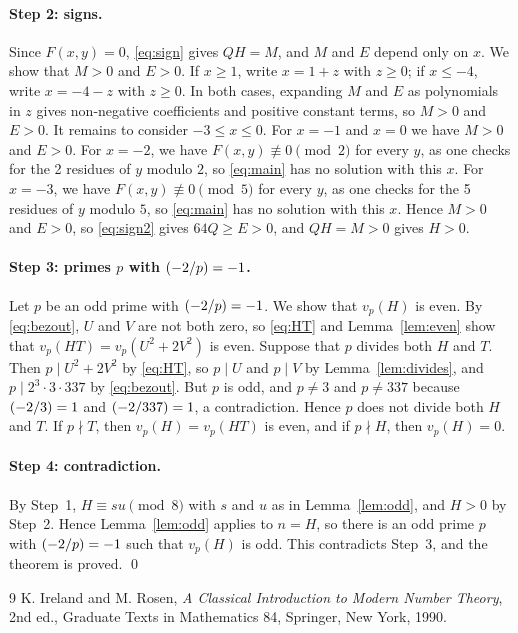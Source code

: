 \documentclass[11pt]{article}
\newcommand{\leg}[2]{\mathchoice{\biggl(\dfrac{#1}{#2}\biggr)}{(#1/#2)}{(#1/#2)}{(#1/#2)}}
\begin{document}
\paragraph{Step 2: signs.} Since $F(x,y)=0$, \eqref{eq:sign} gives $QH=M$, and $M$ and $E$ depend only on $x$. We show that $M>0$ and $E>0$. If $x\geq1$, write $x=1+z$ with $z\geq0$; if $x\leq-4$, write $x=-4-z$ with $z\geq0$. In both cases, expanding $M$ and $E$ as polynomials in $z$ gives non-negative coefficients and positive constant terms, so $M>0$ and $E>0$. It remains to consider $-3\leq x\leq0$. For $x=-1$ and $x=0$ we have $M>0$ and $E>0$. For $x=-2$, we have $F(x,y)\not\equiv0\pmod{2}$ for every $y$, as one checks for the 2 residues of $y$ modulo $2$, so \eqref{eq:main} has no solution with this $x$. For $x=-3$, we have $F(x,y)\not\equiv0\pmod{5}$ for every $y$, as one checks for the 5 residues of $y$ modulo $5$, so \eqref{eq:main} has no solution with this $x$. Hence $M>0$ and $E>0$, so \eqref{eq:sign2} gives $64Q\geq E>0$, and $QH=M>0$ gives $H>0$.

\paragraph{\texorpdfstring{Step 3: primes $p$ with $\leg{-2}{p}=-1$.}{Step 3: inert primes.}} Let $p$ be an odd prime with $\leg{-2}{p}=-1$. We show that $v_p(H)$ is even. By \eqref{eq:bezout}, $U$ and $V$ are not both zero, so \eqref{eq:HT} and Lemma~\ref{lem:even} show that $v_p(HT)=v_p(U^2+2V^2)$ is even. Suppose that $p$ divides both $H$ and $T$. Then $p\mid U^2+2V^2$ by \eqref{eq:HT}, so $p\mid U$ and $p\mid V$ by Lemma~\ref{lem:divides}, and $p\mid 2^{3}\cdot 3\cdot 337$ by \eqref{eq:bezout}. But $p$ is odd, and $p\neq3$ and $p\neq337$ because $\leg{-2}{3}=1$ and $\leg{-2}{337}=1$, a contradiction. Hence $p$ does not divide both $H$ and $T$. If $p\nmid T$, then $v_p(H)=v_p(HT)$ is even, and if $p\nmid H$, then $v_p(H)=0$.

\paragraph{Step 4: contradiction.} By Step~1, $H\equiv su\pmod{8}$ with $s$ and $u$ as in Lemma~\ref{lem:odd}, and $H>0$ by Step~2. Hence Lemma~\ref{lem:odd} applies to $n=H$, so there is an odd prime $p$ with $\leg{-2}{p}=-1$ such that $v_p(H)$ is odd. This contradicts Step~3, and the theorem is proved.
\qed

\begin{thebibliography}{9}
 K. Ireland and M. Rosen, \emph{A Classical Introduction to Modern Number Theory}, 2nd ed., Graduate Texts in Mathematics 84, Springer, New York, 1990.
\end{thebibliography}
\end{document}
